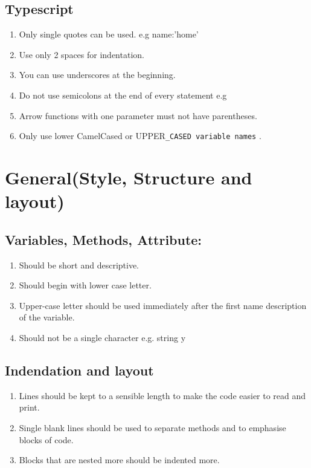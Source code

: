 \documentclass{article}
\begin{document}
        
\subsection{Typescript}
        \begin{enumerate}
            \item Only single quotes can be used. e.g name:'home'
            \item Use only 2 spaces for indentation.
            \item You can use underscores at the beginning.
            \item Do not use semicolons at the end of every statement e.g
            \item  Arrow functions with one parameter must not have parentheses.
            \item Only use lower CamelCased or UPPER\texttt{_CASED variable names} .
            
        \end{enumerate}
\newpage
\section{General(Style, Structure and layout)}
  
        \subsection{Variables, Methods, Attribute:}
            \begin{enumerate}
                \item Should be short and descriptive.
                \item Should begin with lower case letter.
                \item Upper-case letter should be used immediately after the first name description of the variable.
                \item Should not be a single character e.g. string y
            \end{enumerate}
            
            \subsection{Indendation and layout}
                \begin{enumerate}
                    \item Lines should be kept to a sensible length to make the code easier to read and print.
                    \item Single blank lines should be used to separate methods and to emphasise blocks of code.
                    \item Blocks that are nested more should be indented more.
                \end{enumerate}
\end{document}
